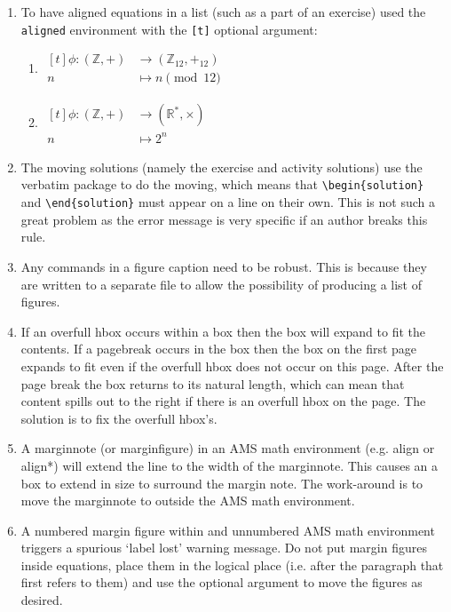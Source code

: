 \documentclass[solutionsatend,twocolumnsolutions]{ouunit}
\begin{document}
\begin{enumerate}[1.]
\item
To have aligned equations in a list (such as a part of an exercise) used the \verb"aligned" environment with the \verb"[t]" optional argument:
\begin{enumerate}
\item \(\begin{aligned}[t]
\phi:(\mathbb{Z},+)&\longrightarrow (\mathbb{Z}_{12},+_{12})\\
  n&\longmapsto n\pmod{12}
  \end{aligned}\)
\item \(\begin{aligned}[t]
\phi:(\mathbb{Z},+)&\longrightarrow (\mathbb{R}^*,\times)\\
  n&\longmapsto 2^n
  \end{aligned}\)
\end{enumerate}
\item
The moving solutions (namely the exercise and activity solutions) use the verbatim package to do the moving, which means that \verb"\begin{solution}" and \verb"\end{solution}" must appear on a line on their own. This is not such a great problem as the error message is very specific if an author breaks this rule.
\item
Any commands in a figure caption need to be robust. This is because they are written to a separate file to allow the possibility of producing a list of figures.
\item
If an overfull hbox occurs within a box then the box will expand to fit the contents. If a pagebreak occurs in the box then the box on the first page expands to fit even if the overfull hbox does not occur on this page. After the page break the box returns to its natural length, which can mean that content spills out to the right if there is an overfull hbox on the page. The solution is to fix the overfull hbox's.
\item
A marginnote (or marginfigure) in an AMS math environment (e.g. align or align*) will extend the line to the width of the marginnote. This causes an a box to extend in size to surround the margin note. The work-around is to move the marginnote to outside the AMS math environment.
\item
A numbered margin figure within and unnumbered AMS math environment triggers a spurious `label lost' warning message. Do not put margin figures inside equations, place them in the logical place (i.e. after the paragraph that first refers to them) and use the optional argument to move the figures as desired.

\end{enumerate}
\end{document}
